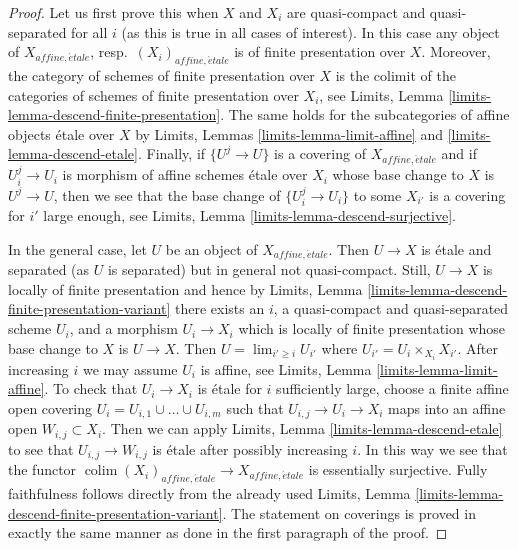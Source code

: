 \documentclass[10pt,a4paper]{amsart}
\theoremstyle{plain}
\theoremstyle{definition}
\theoremstyle{remark}
\numberwithin{equation}{subsection}
\def\lim{\mathop{\mathrm{lim}}\nolimits}
\def\colim{\mathop{\mathrm{colim}}\nolimits}
\def\etale{{\acute{e}tale}}
\begin{document}
\begin{proof}
Let us first prove this when $X$ and $X_i$ are quasi-compact and
quasi-separated for all $i$ (as this is true in all cases of
interest). In this case any object of
$X_{affine, \etale}$, resp.\ $(X_i)_{affine, \etale}$ is
of finite presentation over $X$. Moreover, the
category of schemes of finite presentation over $X$ is the
colimit of the categories of schemes of finite presentation
over $X_i$, see
Limits, Lemma \ref{limits-lemma-descend-finite-presentation}.
The same holds for the subcategories of affine objects \'etale
over $X$ by Limits, Lemmas
\ref{limits-lemma-limit-affine} and \ref{limits-lemma-descend-etale}.
Finally, if $\{U^j \to U\}$ is a covering of $X_{affine, \etale}$
and if $U_i^j \to U_i$ is morphism of affine schemes \'etale over
$X_i$ whose base change to $X$ is $U^j \to U$, then we see that
the base change of $\{U^j_i \to U_i\}$ to some $X_{i'}$ is
a covering for $i'$ large enough, see
Limits, Lemma \ref{limits-lemma-descend-surjective}.

\medskip\noindent
In the general case, let $U$ be an object of $X_{affine, \etale}$.
Then $U \to X$ is \'etale and separated (as $U$ is separated)
but in general not quasi-compact. Still, $U \to X$ is locally
of finite presentation and hence by
Limits, Lemma \ref{limits-lemma-descend-finite-presentation-variant}
there exists an $i$, a quasi-compact and quasi-separated scheme $U_i$, and
a morphism $U_i \to X_i$ which is locally of finite presentation
whose base change to $X$ is $U \to X$. Then $U = \lim_{i' \geq i} U_{i'}$
where $U_{i'} = U_i \times_{X_i} X_{i'}$.
After increasing $i$ we may assume $U_i$ is affine, see
Limits, Lemma \ref{limits-lemma-limit-affine}.
To check that $U_i \to X_i$ is \'etale for $i$ sufficiently large,
choose a finite affine open covering $U_i = U_{i, 1} \cup \ldots \cup U_{i, m}$
such that $U_{i, j} \to U_i \to X_i$ maps into an affine open
$W_{i, j} \subset X_i$. Then we can apply
Limits, Lemma \ref{limits-lemma-descend-etale}
to see that $U_{i, j} \to W_{i, j}$ is \'etale
after possibly increasing $i$.
In this way we see that the functor
$\colim (X_i)_{affine, \etale} \to X_{affine, \etale}$
is essentially surjective. Fully faithfulness follows
directly from the already used
Limits, Lemma \ref{limits-lemma-descend-finite-presentation-variant}.
The statement on coverings is proved in exactly the same
manner as done in the first paragraph of the proof.
\end{proof}
\end{document}
